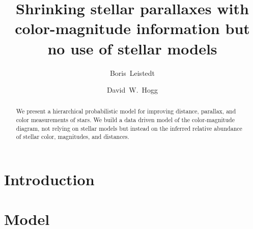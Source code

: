 \documentclass[aps,prd,showpacs,superscriptaddress,groupedaddress]{revtex4}  %
\begin{document}
 
\title{Shrinking stellar parallaxes with color-magnitude information but no use of stellar models}

\author{Boris~Leistedt}
  
\author{David~W.~Hogg}
  
\begin{abstract}
We present a hierarchical probabilistic model for improving distance, parallax, and color measurements of stars. 
We build a data driven model of the color-magnitude diagram, not relying on stellar models but instead on the inferred relative abundance of stellar color, magnitudes, and distances.
\end{abstract}


\maketitle

  
\section{Introduction}


\section{Model}
\end{document}
